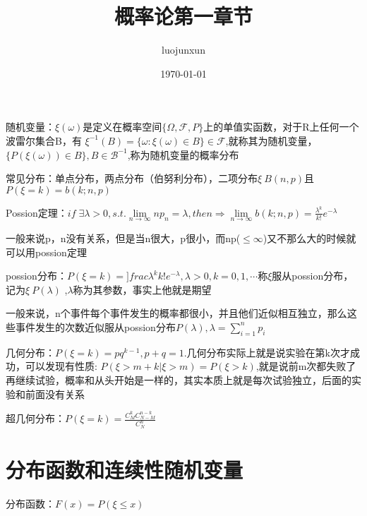 \documentclass[12pt, a4paper, oneside]{ctexart}
\title{\huge\textbf{概率论第一章节}}
\author{luojunxun}
\date{\today}
\begin{document}
\maketitle

随机变量：$\xi(\omega)$是定义在概率空间$\{\Omega,\mathcal{F},P\}$上的单值实函数，对于R上任何一个波雷尔集合B，有
$\xi^{-1}(B)=\{\omega:\xi(\omega)\in B\}\in\mathcal{F}$,就称其为随机变量，$\{P(\xi(\omega))\in B\},B\in\mathcal{B}^{-1}$,称为随机变量的概率分布

常见分布：单点分布，两点分布（伯努利分布），二项分布$\xi ~ B(n,p)$且$P(\xi = k)=b(k;n,p)$

Possion定理：$if\;\exists\lambda>0,s.t.\lim\limits_{n\to\infty}np_n=\lambda,then\Rightarrow \lim\limits_{n\to\infty}b(k;n,p)=\frac{\lambda^k}{k!}e^{-\lambda} $

一般来说p，n没有关系，但是当n很大，p很小，而np($\leq\infty$)又不那么大的时候就可以用possion定理

possion分布：$P(\xi =k)=]frac{\lambda^k}{k!}e^{-\lambda},\lambda>0,k=0,1,\cdots$称$\xi$服从possion分布，记为$\xi ~P(\lambda)$
,$\lambda$称为其参数，事实上他就是期望

一般来说，n个事件每个事件发生的概率都很小，并且他们近似相互独立，那么这些事件发生的次数近似服从possion分布$P(\lambda),\lambda = \sum\limits_{i=1}^np_i$

几何分布：$P(\xi=k)=pq^{k-1},p+q=1$.几何分布实际上就是说实验在第k次才成功，可以发现有性质:
$P(\xi>m+k|\xi>m)=P(\xi>k)$,就是说前m次都失败了再继续试验，概率和从头开始是一样的，其实本质上就是每次试验独立，后面的实验和前面没有关系

超几何分布：$P(\xi=k)=\frac{C_M^kC_{N-M}^{n-k}}{C_N^n}$

\section*{分布函数和连续性随机变量}

分布函数：$F(x)=P(\xi \leq x)$


















% 
% 
\end{document}
